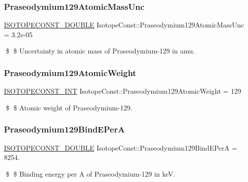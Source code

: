\subsubsection{\texorpdfstring{Praseodymium129\+Atomic\+Mass\+Unc}{Praseodymium129AtomicMassUnc}}
{\footnotesize\ttfamily \mbox{\hyperlink{group___isotope_const-_macros_ga8f45a7272ce02c0b4c65c44636ed719a}{I\+S\+O\+T\+O\+P\+E\+C\+O\+N\+S\+T\+\_\+\+D\+O\+U\+B\+LE}} Isotope\+Const\+::\+Praseodymium129\+Atomic\+Mass\+Unc = 3.\+2e-\/05}

\$ \$ Uncertainty in atomic mass of Praseodymium-\/129 in amu. \mbox{\label{group___isotope_const-_praseodymium-_pr129_ga9a5cc9fca105d4bf21ffa0e6c53e3d96}} 
\subsubsection{\texorpdfstring{Praseodymium129\+Atomic\+Weight}{Praseodymium129AtomicWeight}}
{\footnotesize\ttfamily \mbox{\hyperlink{group___isotope_const-_macros_ga5f18360b3e99483a35c32d789e62621c}{I\+S\+O\+T\+O\+P\+E\+C\+O\+N\+S\+T\+\_\+\+I\+NT}} Isotope\+Const\+::\+Praseodymium129\+Atomic\+Weight = 129}

\$ \$ Atomic weight of Praseodymium-\/129. \mbox{\label{group___isotope_const-_praseodymium-_pr129_ga0c3eb8016b5f22ca69f8215cad008294}} 
\subsubsection{\texorpdfstring{Praseodymium129\+Bind\+E\+PerA}{Praseodymium129BindEPerA}}
{\footnotesize\ttfamily \mbox{\hyperlink{group___isotope_const-_macros_ga8f45a7272ce02c0b4c65c44636ed719a}{I\+S\+O\+T\+O\+P\+E\+C\+O\+N\+S\+T\+\_\+\+D\+O\+U\+B\+LE}} Isotope\+Const\+::\+Praseodymium129\+Bind\+E\+PerA = 8254.}

\$ \$ Binding energy per A of Praseodymium-\/129 in keV. \mbox{\label{group___isotope_const-_praseodymium-_pr129_gab23692a827e4657736a1a0b8b76eddab}} 

